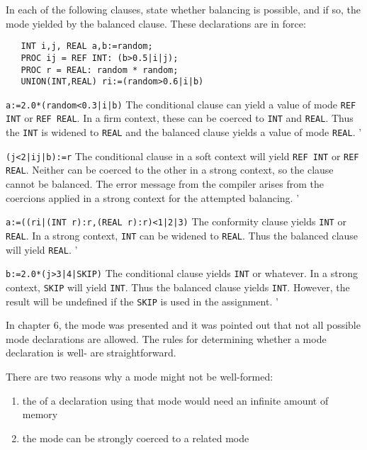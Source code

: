 \begin{exercise}
\item In each of the following clauses, state whether balancing is
possible, and if so, the mode yielded by the balanced clause. These
declarations are in force:
\begin{verbatim}
   INT i,j, REAL a,b:=random;
   PROC ij = REF INT: (b>0.5|i|j);
   PROC r = REAL: random * random;
   UNION(INT,REAL) ri:=(random>0.6|i|b)
\end{verbatim}
\indent\begin{subex}
\item \verb!a:=2.0*(random<0.3|i|b)! \subans The conditional clause
can yield a value of mode \verb|REF INT| or \texttt{REF REAL}. In a
firm context, these can be coerced to \verb|INT| and \verb|REAL|.
Thus the \verb|INT| is widened to \verb|REAL| and the balanced clause
yields a value of mode \verb|REAL|.
'
\item \verb!(j<2|ij|b):=r! \subans The conditional clause in a soft
context will yield \verb|REF INT| or \verb|REF REAL|. Neither can be
coerced to the other in a strong context, so the clause cannot be
balanced. The error message from the compiler arises from the
coercions applied in a strong context for the attempted balancing.
'
\item \verb!a:=((ri|(INT r):r,(REAL r):r)<1|2|3)! \subans The
conformity clause yields \verb|INT| or \verb|REAL|. In a strong
context, \verb|INT| can be widened to \verb|REAL|. Thus the balanced
clause will yield \verb|REAL|.
'
\item \verb!b:=2.0*(j>3|4|SKIP)! \subans The conditional clause
yields \verb|INT| or whatever. In a strong context, \verb|SKIP| will
yield \verb|INT|. Thus the balanced clause yields \verb|INT|.
However, the result will be undefined if the \verb|SKIP| is used in
the assignment.
'
\end{subex}
\end{exercise}

In chapter 6, the mode  was
presented and it was pointed out that not all possible mode
declarations are allowed.  The rules for determining whether a mode
declaration is well- are
straightforward.

There are two reasons why a mode might not be well-formed:
\begin{enumerate}
\item the  of a declaration using that
mode would need an infinite amount of memory
\item the mode can be strongly coerced to a related
mode
\end{enumerate}

